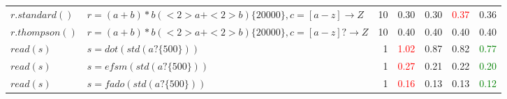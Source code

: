 \begin{tabular}{llr *{4}{r}}
$r.standard()$ & $r = (a+b)*b(<2>a+<2>b)\{20000\}, c = [a-z] \rightarrow Z$ & 10 & \num{ 0.30} & \num{ 0.30} & \textcolor{red}{\num{ 0.37}} & \num{ 0.36} \\
$r.thompson()$ & $r = (a+b)*b(<2>a+<2>b)\{20000\}, c = [a-z]? \rightarrow Z$ & 10 & \num{ 0.40} & \num{ 0.40} & \num{ 0.40} & \num{ 0.40} \\
$read(s)$ & $s = dot(std(a?\{500\}))$ & 1 & \textcolor{red}{\num{ 1.02}} & \num{ 0.87} & \num{ 0.82} & \textcolor{green}{\num{ 0.77}} \\
$read(s)$ & $s = efsm(std(a?\{500\}))$ & 1 & \textcolor{red}{\num{ 0.27}} & \num{ 0.21} & \num{ 0.22} & \textcolor{green}{\num{ 0.20}} \\
$read(s)$ & $s = fado(std(a?\{500\}))$ & 1 & \textcolor{red}{\num{ 0.16}} & \num{ 0.13} & \num{ 0.13} & \textcolor{green}{\num{ 0.12}} \\
\bottomrule
\end{tabular}

